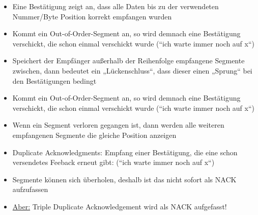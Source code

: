\begin{itemize}
    \item Eine Bestätigung zeigt an, dass alle Daten bis zu der verwendeten Nummer/Byte Position korrekt empfangen wurden
    \item Kommt ein Out-of-Order-Segment an, so wird demnach eine Bestätigung verschickt, die schon einmal verschickt wurde (“ich warte immer noch auf x“)
    \item Speichert der Empfänger außerhalb der Reihenfolge empfangene Segmente zwischen, dann bedeutet ein „Lückenschluss“, dass dieser einen „Sprung“ bei den Bestätigungen bedingt
\end{itemize}

\begin{itemize}
    \item Kommt ein Out-of-Order-Segment an, so wird demnach eine Bestätigung verschickt, die schon einmal verschickt wurde (“ich warte immer noch auf x“)
    \item Wenn ein Segment verloren gegangen ist, dann werden alle weiteren empfangenen Segmente die gleiche Position anzeigen
    \item Duplicate Acknowledgments: Empfang einer Bestätigung, die eine schon versendetes Feeback erneut gibt: (“ich warte immer noch auf x“)
    \item Segmente können sich überholen, deshalb ist das nicht sofort als NACK aufzufassen
    \item \underline{Aber:} Triple Duplicate Acknowledgement wird als NACK aufgefasst!
\end{itemize}